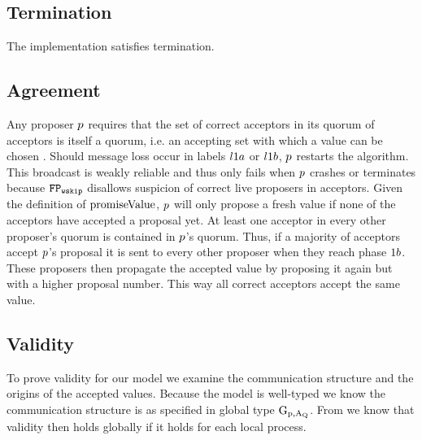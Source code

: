 \subsection{Termination}
The implementation satisfies termination.


\subsection{Agreement}
Any proposer $p$ requires that the set of correct acceptors in its quorum of acceptors is itself a quorum, i.e. an accepting set with which a value can be chosen \cite{lower_bounds}.
Should message loss occur in labels $l1a$ or $l1b$, $p$ restarts the algorithm.
This broadcast is weakly reliable and thus only fails when $p$ crashes or terminates because $\mathtt{FP_{wskip}}$ disallows suspicion of correct live proposers in acceptors.
Given the definition of $\operatorname{promiseValue}$, $p$ will only propose a fresh value if none of the acceptors have accepted a proposal yet.
At least one acceptor in every other proposer's quorum is contained in $p$'s quorum.
Thus, if a majority of acceptors accept $p$'s proposal it is sent to every other proposer when they reach phase $1b$.
These proposers then propagate the accepted value by proposing it again but with a higher proposal number.
This way all correct acceptors accept the same value.

\subsection{Validity}
To prove validity for our model we examine the communication structure and the origins of the accepted values.
Because the model is well-typed we know the communication structure is as specified in global type $\operatorname{G_{p, A_Q}}$.
From \cite{ftmpst} we know that validity then holds globally if it holds for each local process.

